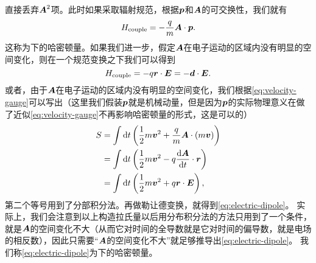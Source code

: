 直接丢弃$\vb*{A}^2$项。此时如果采取辐射规范，根据$\vb*{p}$和$\vb*{A}$的可交换性，我们就有
\begin{equation}
    H_\text{couple} = - \frac{q}{m} \vb*{A} \cdot \vb*{p}.
    \label{eq:velocity-gauge}
\end{equation}
这称为下的哈密顿量。如果我们进一步，假定$\vb*{A}$在电子运动的区域内没有明显的空间变化，则在一个规范变换之下我们可以得到
\begin{equation}
    H_\text{couple} = - q \vb*{r} \cdot \vb*{E} = - \vb*{d} \cdot \vb*{E}.
    \label{eq:electric-dipole}
\end{equation}
或者，由于$\vb*{A}$在电子运动的区域内没有明显的空间变化，我们根据\eqref{eq:velocity-gauge}可以写出（这里我们假装$\vb*{p}$就是机械动量，但是因为$\vb*{p}$的实际物理意义在做了近似\eqref{eq:velocity-gauge}不再影响哈密顿量的形式，这是可以的）
\[
    \begin{aligned}
        S &= \int \dd{t} \left( \frac{1}{2} m \vb*{v}^2 + \frac{q}{m} \vb*{A} \cdot (m \vb*{v}) \right) \\
        &= \int \dd{t} \left( \frac{1}{2} m \vb*{v}^2 - q \dv{\vb*{A}}{t} \cdot \vb*{r} \right) \\
        &= \int \dd{t} \left( \frac{1}{2} m \vb*{v}^2 + q \vb*{r} \cdot \vb*{E} \right),
    \end{aligned} 
\]
第二个等号用到了分部积分法。再做勒让德变换，就得到\eqref{eq:electric-dipole}。
实际上，我们会注意到以上构造拉氏量以后用分布积分法的方法只用到了一个条件，就是$\vb*{A}$的空间变化不大（从而它对时间的全导数就是它对时间的偏导数，就是电场的相反数），因此只需要“$\vb*{A}$的空间变化不大”就足够推导出\eqref{eq:electric-dipole}。
我们称\eqref{eq:electric-dipole}为下的哈密顿量。

